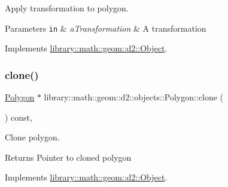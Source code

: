 Apply transformation to polygon. 


\begin{DoxyParams}[1]{Parameters}
\mbox{\tt in}  & {\em a\+Transformation} & A transformation \\
\hline
\end{DoxyParams}


Implements \hyperlink{classlibrary_1_1math_1_1geom_1_1d2_1_1_object_a289589fb6e9e7a2c4ca4976a1544def5}{library\+::math\+::geom\+::d2\+::\+Object}.

\mbox{\label{classlibrary_1_1math_1_1geom_1_1d2_1_1objects_1_1_polygon_a15bbbe7e468a50d6059e2df946175e1c}} 
\subsubsection{\texorpdfstring{clone()}{clone()}}
{\footnotesize\ttfamily \hyperlink{classlibrary_1_1math_1_1geom_1_1d2_1_1objects_1_1_polygon}{Polygon} $\ast$ library\+::math\+::geom\+::d2\+::objects\+::\+Polygon\+::clone (\begin{DoxyParamCaption}{ }\end{DoxyParamCaption}) const\hspace{0.3cm}{\ttfamily [override]}, {\ttfamily [virtual]}}



Clone polygon. 

\begin{DoxyReturn}{Returns}
Pointer to cloned polygon 
\end{DoxyReturn}


Implements \hyperlink{classlibrary_1_1math_1_1geom_1_1d2_1_1_object_a5c26ae4120edb24f6463d65a9cef247d}{library\+::math\+::geom\+::d2\+::\+Object}.

\mbox{\label{classlibrary_1_1math_1_1geom_1_1d2_1_1objects_1_1_polygon_a9a59a791536ec6ca38fe75d378aadc8e}} 
